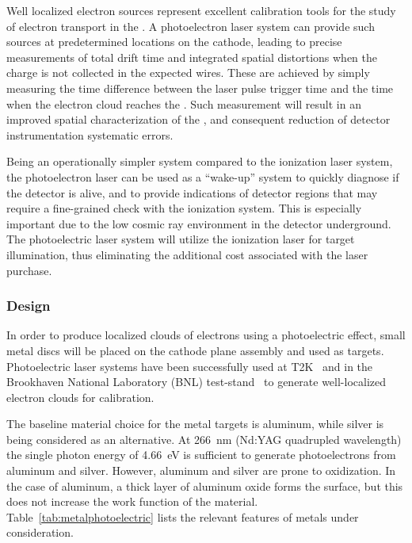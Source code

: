 
Well localized electron sources represent excellent calibration tools for the study of electron transport in the . 
A photoelectron laser system can provide such sources at predetermined locations on the cathode, leading to precise  measurements of total drift time and integrated spatial distortions when the charge is not collected in the expected wires. These are achieved by simply measuring the time difference between the laser pulse trigger time and the time when the electron cloud reaches the 
.
Such measurement will result in an improved spatial characterization of the \efield, and consequent reduction of detector instrumentation systematic errors.

Being an operationally simpler system compared to the ionization laser system, the photoelectron laser can be used as a ``wake-up'' system to quickly diagnose if the detector is alive, and to provide indications of detector regions that may require a fine-grained check with the ionization system. This is especially important due to the low cosmic ray environment in the detector underground. The photoelectric laser system will utilize the ionization laser for target illumination, thus eliminating the additional cost associated with the laser purchase.


\subsubsection{Design}
\label{sec:sp-calib-sys-las-pe-des}

In order to produce localized clouds of electrons using a photoelectric effect, small metal discs will be placed on the cathode plane assembly and used as targets. Photoelectric laser systems have been successfully used at T2K~\cite{Abgrall:2010hi} and in the Brookhaven National Laboratory (BNL)  test-stand~\cite{Li:2016ods} to generate well-localized electron clouds for \efield calibration. 


The baseline material choice for the metal targets is aluminum, while silver is being considered as an alternative. At \SI{266}{\nano\m} (Nd:YAG quadrupled wavelength) the single photon energy of \SI{4.66}{\eV} is sufficient to generate photoelectrons from aluminum and silver. However, aluminum and silver are prone to oxidization.
In the case of aluminum, a thick layer of aluminum oxide forms the surface, but this does not increase the work function of the material. Table~\ref{tab:metalphotoelectric} lists the relevant features of metals under consideration.  


